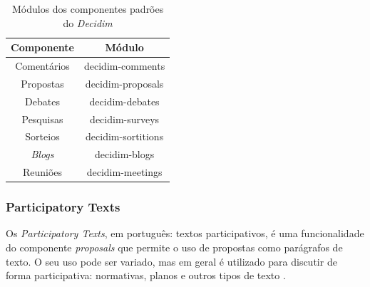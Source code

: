 \begin{table}
  \centering
  \caption{Módulos dos componentes padrões do \textit{Decidim}}
  \label{tab:modulos-components}
  \begin{tabular}{cc}
    \toprule
    Componente & Módulo \\
    \midrule
    Comentários & decidim-comments \\
    Propostas & decidim-proposals \\
    Debates & decidim-debates \\
    Pesquisas & decidim-surveys \\
    Sorteios & decidim-sortitions \\
    \textit{Blogs} & decidim-blogs \\
    Reuniões & decidim-meetings \\
    \bottomrule
  \end{tabular}
\end{table}

\subsubsection {Participatory Texts}

Os \textit{Participatory Texts}, em português: textos participativos, é uma funcionalidade do componente \textit{proposals} que permite o uso de propostas como parágrafos de texto. O seu uso pode ser variado, mas em geral é utilizado para discutir de forma participativa: normativas, planos e outros tipos de texto \cite{decidim-participatory-texts}.